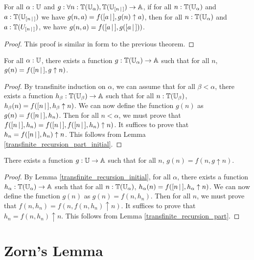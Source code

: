 \documentclass[../../math.tex]{subfiles}
\begin{document}
\begin{lemma} \label{transfinite_recursion_part_initial}
    For all $\alpha : \mathbb{U}$ and $g : \forall n : \mathbb{T}(\mathbb{U}_\alpha), \mathbb{T}(\mathbb{U}_{[ n\, |\,]})
    \to \mathbb{A}$, if for all $n : \mathbb{T}(\mathbb{U}_\alpha)$ and $a : \mathbb{T}(\mathbb{U}_{[ n\, |\,]})$ we have
    $g(n, a) = f([ a\, |\,], g(n) \uparrow a)$, then for all $n : \mathbb{T}(\mathbb{U}_\alpha)$ and
    $a : \mathbb{T}(U_{[ n\, |\,]})$, we have $g(n, a) = f([ a\, |\,], g([ a\, |\,]))$.
\end{lemma}
\begin{proof}
    This proof is similar in form to the previous theorem.
\end{proof}

\begin{lemma} \label{transfinite_recursion_initial}
    For all $\alpha : \mathbb{U}$, there exists a function $g : \mathbb{T}(\mathbb{U}_\alpha) \to \mathbb{A}$
    such that for all $n$, $g(n) = f([ n\, |\,], g \uparrow n)$.
\end{lemma}
\begin{proof}
    By transfinite induction on $\alpha$, we can assume that for all $\beta <
    \alpha$, there exists a function $h_\beta : \mathbb{T}(\mathbb{U}_\beta) \to \mathbb{A}$ such that
    for all $n : \mathbb{T}(\mathbb{U}_\beta)$, $h_\beta(n) = f([ n\, |\,], h_\beta \uparrow n)$.
    We can now define the function $g(n)$ as $g(n) = f([ n\, |\,], h_n)$.  Then for
    all $n < \alpha$, we must prove that $f([ n\, |\,], h_n) = f([ n\, |\,], f([ n\, |\,],
    h_n) \uparrow n)$.  It suffices to prove that $h_n = f([ n\, |\,], h_n) \uparrow
    n$.  This follows from Lemma \ref{transfinite_recursion_part_initial}.
\end{proof}

\begin{theorem}
    There exists a function $g : \mathbb{U} \to \mathbb{A}$ such that for all $n$, $g(n) = f(n,
    g \uparrow n)$.
\end{theorem}
\begin{proof}
    By Lemma \ref{transfinite_recursion_initial}, for all $\alpha$, there exists
    a function $h_\alpha : \mathbb{T}(\mathbb{U}_\alpha) \to \mathbb{A}$ such that for all $n :
    \mathbb{T}(\mathbb{U}_\alpha)$, $h_\alpha(n) = f([ n\, |\,], h_\alpha \uparrow n)$.  We can now
    define the function $g(n)$ as $g(n) = f(n, h_n)$.  Then for all $n$, we must
    prove that $f(n, h_n) = f(n, f(n, h_n) \uparrow n)$.  It suffices to prove
    that $h_n = f(n, h_n) \uparrow n$.  This follows from Lemma
    \ref{transfinite_recursion_part}.
\end{proof}

\section{Zorn's Lemma}
\end{document}
